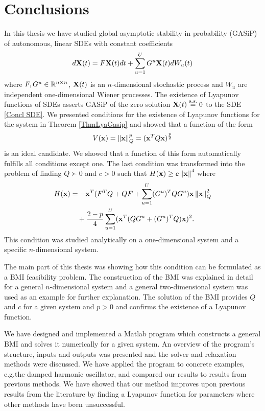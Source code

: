 \documentclass[a4paper,12pt,twoside,BCOR=10mm]{scrbook}
\begin{document}
\chapter{Conclusions}
In this thesis we have studied global asymptotic stability in probability (GASiP) of autonomous, linear SDEs with constant coefficients
\begin{align}\label{Concl SDE}
    d\mathbf{X}(t) = F\mathbf{X}(t)dt + \sum\limits_{u = 1}^UG^u \mathbf{X}(t)dW_u(t)
\end{align}
where $F,G^u \in \mathbb{R}^{n\times n}$, $\mathbf{X}(t)$ is an $n$-dimensional stochastic process and $W_u$ are independent one-dimensional Wiener processes. The existence of Lyapunov functions of SDEs asserts GASiP of the zero solution $\mathbf{X}(t) \stackrel{\text{a.s.}}{=} 0$ to the SDE \eqref{Concl SDE}. We presented conditions for the existence of Lyapunov functions for the system in Theorem \ref{ThmLyaGasip} and showed that a function of the form
\begin{align*}
    V(\mathbf{x}) = \left\lVert\mathbf{x}\right\rVert_Q^p = (\mathbf{x}^T Q \mathbf{x})^\frac{p}{2}
\end{align*}
is an ideal candidate. We showed that a function of this form automatically fulfills all conditions except one. The last condition was transformed into the problem of finding $Q \succ 0$ and $c > 0$ such that $H(\mathbf{x}) \geq c\left\lVert\mathbf{x}\right\rVert_{}^{4}$ where
\begin{align*}
    H(\mathbf{x}) &= -\mathbf{x}^T (F^T Q + QF + \sum_{u = 1}^U (G^u)^TQG^u) \mathbf{x}\left\lVert\mathbf{x}\right\rVert_{Q}^{2}\\
    &\quad+ \frac{2 - p}{4} \sum_{u = 1}^U (\mathbf{x}^T (QG^u + (G^u)^TQ)\mathbf{x})^2.
\end{align*}
This condition was studied analytically on a one-dimensional system and a specific $n$-dimensional system.

The main part of this thesis was showing how this condition can be formulated as a BMI feasibility problem. The construction of the BMI was explained in detail for a general $n$-dimensional system and a general two-dimensional system was used as an example for further explanation. The solution of the BMI provides $Q$ and $c$ for a given system and $p > 0$ and confirms the existence of a Lyapunov function.

We have designed and implemented a Matlab program which constructs a general BMI and solves it numerically for a given system. An overview of the program's structure, inputs and outputs was presented and the solver and relaxation methods were discussed. We have applied the program to concrete examples, e.g.\@ the damped harmonic oscillator, and compared our results to results from previous methods. We have showed that our method improves upon previous results from the literature by finding a Lyapunov function for parameters where other methods have been unsuccessful.


\end{document}
